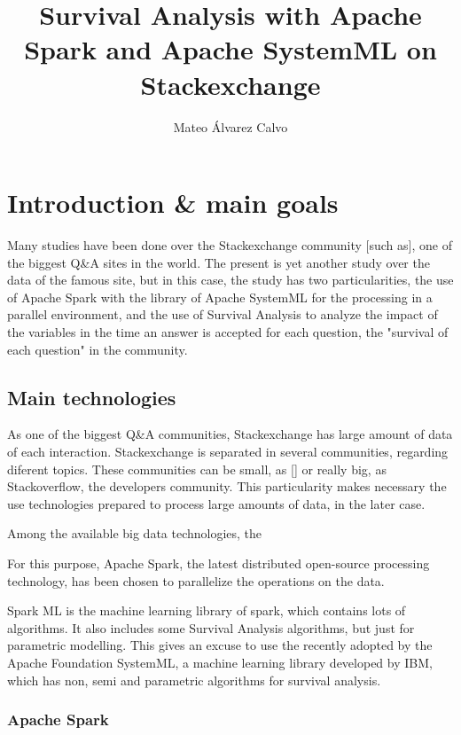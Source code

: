 \documentclass[11pt]{article} %
\title{Survival Analysis with Apache Spark and Apache SystemML on Stackexchange}
\author{Mateo Álvarez Calvo}
\begin{document}
\maketitle

\newpage
\tableofcontents
\newpage

\section{Introduction \& main goals}

Many studies have been done over the Stackexchange community [such as], one of the biggest Q\&A sites in the world. The present is yet another study over the data of the famous site, but in this case, the study has two particularities, the use of Apache Spark with the library of Apache SystemML for the processing in a parallel environment, and the use of Survival Analysis to analyze the impact of the variables in the time an answer is accepted for each question, the "survival of each question" in the community.

\subsection{Main technologies}

As one of the biggest Q\&A communities, Stackexchange has large amount of data of each interaction.
Stackexchange is separated in several communities, regarding diferent topics. These communities can be small, as [] or really big, as Stackoverflow, the developers community. This particularity makes necessary the use technologies prepared to process large amounts of data, in the later case.

Among the available big data technologies, the

For this purpose, Apache Spark, the latest distributed open-source processing technology, has been chosen to parallelize the operations on the data.

Spark ML is the machine learning library of spark, which contains lots of algorithms. It also includes some Survival Analysis algorithms, but just for parametric modelling. This gives an excuse to use the recently adopted by the Apache Foundation SystemML, a machine learning library developed by IBM, which has non, semi and parametric algorithms for survival analysis.


\subsubsection{Apache Spark}
\end{document}
